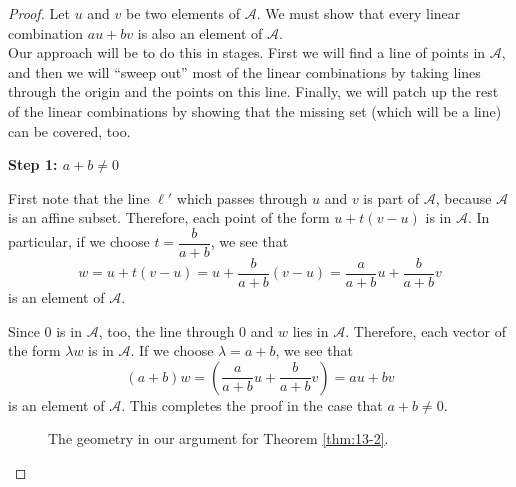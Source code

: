 \documentclass[elementsmain.tex]{subfiles}
\begin{document}
\begin{proof} Let $u$ and $v$ be two elements of $\mathcal{A}$. We must show that every linear combination $au+bv$ is also an element of $\mathcal{A}$. \\

Our approach will be to do this in stages. First we will find a line of points in $\mathcal{A}$, and then we will ``sweep out'' most of the linear combinations by taking lines through the origin and the points on this line. Finally, we will patch up the rest of the linear combinations by showing that the missing set (which will be a line) can be covered, too.

\noindent
\textbf{Step 1: $a+b\neq 0$}

First note that the line $\ell'$ which passes through $u$ and $v$ is part of $\mathcal{A}$, because $\mathcal{A}$ is an affine subset. Therefore, each point of the form $u + t(v-u)$ is in $\mathcal{A}$. In particular, if we choose $t = \dfrac{b}{a+b}$, we see that 
\[
w = u + t (v-u) = u + \dfrac{b}{a+b}(v-u) = \dfrac{a}{a+b} u + \dfrac{b}{a+b} v
\]
is an element of $\mathcal{A}$. 

Since $0$ is in $\mathcal{A}$, too, the line through $0$ and $w$ lies in $\mathcal{A}$. Therefore, each vector of the form $\lambda w$ is in $\mathcal{A}$.
If we choose $\lambda = a+b$, we see that 
\[
(a+b) w = \left( \dfrac{a}{a+b} u + \dfrac{b}{a+b} v \right) = au + bv
\]
is an element of $\mathcal{A}$. This completes the proof in the case that $a+b\neq 0$.

\begin{figure}[h]
\centering
{}
\caption{The geometry in our argument for Theorem \ref{thm:13-2}.}
\label{fig:13-plane-sweep}
\end{figure}


\end{proof}
\end{document}
